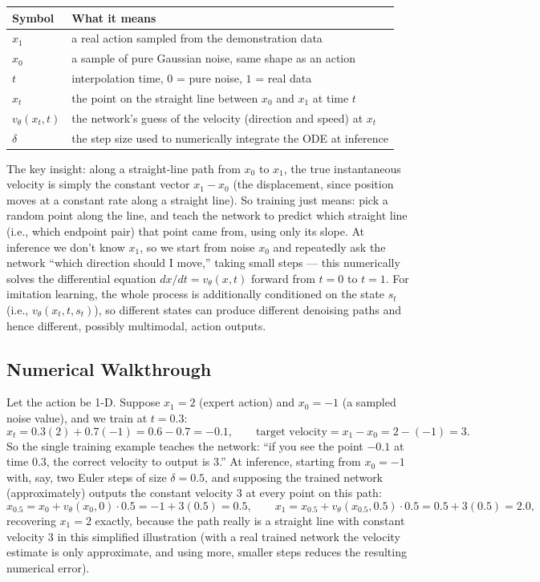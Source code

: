 \documentclass[11pt]{article}
\begin{document}
\begin{center}
\begin{tabular}{@{}ll@{}}
\toprule
Symbol & What it means \\
\midrule
$x_1$ & a real action sampled from the demonstration data \\
$x_0$ & a sample of pure Gaussian noise, same shape as an action \\
$t$ & interpolation time, $0$ = pure noise, $1$ = real data \\
$x_t$ & the point on the straight line between $x_0$ and $x_1$ at time $t$ \\
$v_\theta(x_t,t)$ & the network's guess of the velocity (direction and speed) at $x_t$ \\
$\delta$ & the step size used to numerically integrate the ODE at inference \\
\bottomrule
\end{tabular}
\end{center}

The key insight: along a straight-line path from $x_0$ to $x_1$, the true instantaneous velocity is simply the constant vector $x_1 - x_0$ (the displacement, since position moves at a constant rate along a straight line). So training just means: pick a random point along the line, and teach the network to predict which straight line (i.e., which endpoint pair) that point came from, using only its slope. At inference we don't know $x_1$, so we start from noise $x_0$ and repeatedly ask the network ``which direction should I move,'' taking small steps --- this numerically solves the differential equation $dx/dt = v_\theta(x,t)$ forward from $t=0$ to $t=1$. For imitation learning, the whole process is additionally conditioned on the state $s_t$ (i.e., $v_\theta(x_t,t,s_t)$), so different states can produce different denoising paths and hence different, possibly multimodal, action outputs.

\subsection*{Numerical Walkthrough}

Let the action be 1-D. Suppose $x_1 = 2$ (expert action) and $x_0 = -1$ (a sampled noise value), and we train at $t=0.3$:
\[
x_t = 0.3(2) + 0.7(-1) = 0.6 - 0.7 = -0.1, \qquad \text{target velocity} = x_1 - x_0 = 2-(-1) = 3.
\]
So the single training example teaches the network: ``if you see the point $-0.1$ at time $0.3$, the correct velocity to output is $3$.'' At inference, starting from $x_0=-1$ with, say, two Euler steps of size $\delta=0.5$, and supposing the trained network (approximately) outputs the constant velocity $3$ at every point on this path:
\[
x_{0.5} = x_0 + v_\theta(x_0,0)\cdot 0.5 = -1 + 3(0.5) = 0.5, \qquad
x_{1} = x_{0.5} + v_\theta(x_{0.5},0.5)\cdot 0.5 = 0.5 + 3(0.5) = 2.0,
\]
recovering $x_1=2$ exactly, because the path really is a straight line with constant velocity $3$ in this simplified illustration (with a real trained network the velocity estimate is only approximate, and using more, smaller steps reduces the resulting numerical error).
\end{document}
